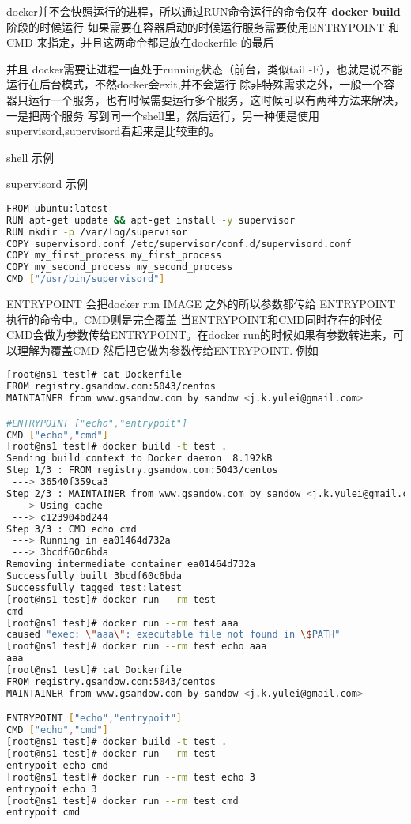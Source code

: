docker并不会快照运行的进程，所以通过RUN命令运行的命令仅在 \textbf{docker build} 阶段的时候运行
如果需要在容器启动的时候运行服务需要使用ENTRYPOINT 和 CMD 来指定，并且这两命令都是放在dockerfile
的最后

并且 docker需要让进程一直处于running状态（前台，类似tail -F），也就是说不能运行在后台模式，不然docker会exit,并不会运行
除非特殊需求之外，一般一个容器只运行一个服务，也有时候需要运行多个服务，这时候可以有两种方法来解决，一是把两个服务
写到同一个shell里，然后运行，另一种便是使用supervisord,supervisord看起来是比较重的。

shell 示例

%

supervisord 示例

\begin{lstlisting}[language=bash]
FROM ubuntu:latest
RUN apt-get update && apt-get install -y supervisor
RUN mkdir -p /var/log/supervisor
COPY supervisord.conf /etc/supervisor/conf.d/supervisord.conf
COPY my_first_process my_first_process
COPY my_second_process my_second_process
CMD ["/usr/bin/supervisord"]
\end{lstlisting}

ENTRYPOINT 会把docker run IMAGE 之外的所以参数都传给 ENTRYPOINT 执行的命令中。CMD则是完全覆盖
当ENTRYPOINT和CMD同时存在的时候 CMD会做为参数传给ENTRYPOINT。在docker run的时候如果有参数转进来，可以理解为覆盖CMD
然后把它做为参数传给ENTRYPOINT.
例如

\begin{lstlisting}[language=bash]
[root@ns1 test]# cat Dockerfile
FROM registry.gsandow.com:5043/centos
MAINTAINER from www.gsandow.com by sandow <j.k.yulei@gmail.com>

#ENTRYPOINT ["echo","entrypoit"]
CMD ["echo","cmd"]
[root@ns1 test]# docker build -t test .
Sending build context to Docker daemon  8.192kB
Step 1/3 : FROM registry.gsandow.com:5043/centos
 ---> 36540f359ca3
Step 2/3 : MAINTAINER from www.gsandow.com by sandow <j.k.yulei@gmail.com>
 ---> Using cache
 ---> c123904bd244
Step 3/3 : CMD echo cmd
 ---> Running in ea01464d732a
 ---> 3bcdf60c6bda
Removing intermediate container ea01464d732a
Successfully built 3bcdf60c6bda
Successfully tagged test:latest
[root@ns1 test]# docker run --rm test
cmd
[root@ns1 test]# docker run --rm test aaa
caused "exec: \"aaa\": executable file not found in \$PATH"
[root@ns1 test]# docker run --rm test echo aaa
aaa
[root@ns1 test]# cat Dockerfile
FROM registry.gsandow.com:5043/centos
MAINTAINER from www.gsandow.com by sandow <j.k.yulei@gmail.com>

ENTRYPOINT ["echo","entrypoit"]
CMD ["echo","cmd"]
[root@ns1 test]# docker build -t test .
[root@ns1 test]# docker run --rm test
entrypoit echo cmd
[root@ns1 test]# docker run --rm test echo 3
entrypoit echo 3
[root@ns1 test]# docker run --rm test cmd
entrypoit cmd
\end{lstlisting}

